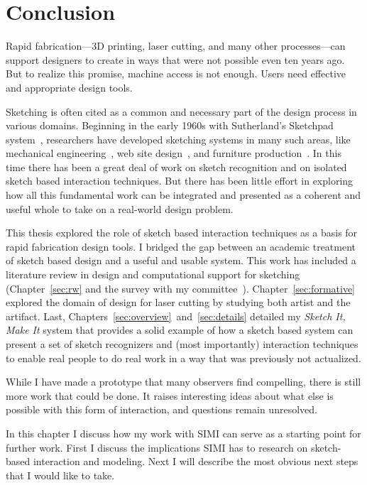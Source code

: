 \chapter{Conclusion}

Rapid fabrication---3D printing, laser cutting, and many other
processes---can support designers to create in ways that were not
possible even ten years ago. But to realize this promise, machine
access is not enough. Users need effective and appropriate design
tools.

Sketching is often cited as a common and necessary part of the design
process in various domains. Beginning in the early 1960s with
Sutherland's Sketchpad system~\cite{sutherland-sketchpad}, researchers
have developed sketching systems in many such areas, like mechanical
engineering~\cite{lipson-correlation}, web site
design~\cite{lin-denim}, and furniture
production~\cite{oh-fab,saul-sketch-chair}. In this time there has
been a great deal of work on sketch recognition and on isolated sketch
based interaction techniques. But there has been little effort in
exploring how all this fundamental work can be integrated and
presented as a coherent and useful whole to take on a real-world
design problem.

This thesis explored the role of sketch based interaction techniques
as a basis for rapid fabrication design tools. I bridged the gap
between an academic treatment of sketch based design and a useful and
usable system. This work has included a literature review in design
and computational support for sketching (Chapter~\ref{sec:rw} and the
survey with my
committee~\cite{johnson-sketch-review}). Chapter~\ref{sec:formative}
explored the domain of design for laser cutting by studying both
artist and the artifact. Last,
Chapters~\ref{sec:overview}~and~\ref{sec:details} detailed my
\textit{Sketch It, Make It} system that provides a solid example of
how a sketch based system can present a set of sketch recognizers and
(most importantly) interaction techniques to enable real people to do
real work in a way that was previously not actualized.

While I have made a prototype that many observers find compelling,
there is still more work that could be done. It raises interesting
ideas about what else is possible with this form of interaction,
and questions remain unresolved.

In this chapter I discuss how my work with SIMI can serve as a
starting point for further work. First I discuss the implications SIMI
has to research on sketch-based interaction and modeling. Next I will
describe the most obvious next steps that I would like to take.

